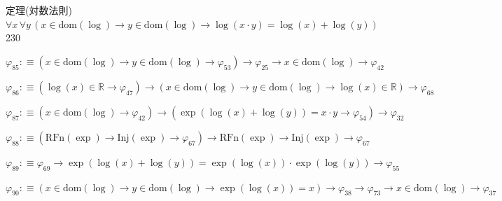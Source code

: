 \begin{fullproof}{定理(対数法則)}{$\forall x\,\forall y\,(x \in \mathrm{dom}(\log) \to y \in \mathrm{dom}(\log) \to \log(x \cdot y) = \log(x) + \log(y))$}{230}
\begin{abbrevlist}
\item $\varphi_{85} :\equiv (x \in \mathrm{dom}(\log) \to y \in \mathrm{dom}(\log) \to \varphi_{53}) \to \varphi_{25} \to x \in \mathrm{dom}(\log) \to \varphi_{42}$
\item $\varphi_{86} :\equiv (\log(x) \in \mathbb{R} \to \varphi_{47}) \to (x \in \mathrm{dom}(\log) \to y \in \mathrm{dom}(\log) \to \log(x) \in \mathbb{R}) \to \varphi_{68}$
\item $\varphi_{87} :\equiv (x \in \mathrm{dom}(\log) \to \varphi_{42}) \to (\exp(\log(x) + \log(y)) = x \cdot y \to \varphi_{54}) \to \varphi_{32}$
\item $\varphi_{88} :\equiv (\mathrm{RFn}(\exp) \to \mathrm{Inj}(\exp) \to \varphi_{67}) \to \mathrm{RFn}(\exp) \to \mathrm{Inj}(\exp) \to \varphi_{67}$
\item $\varphi_{89} :\equiv \varphi_{69} \to \exp(\log(x) + \log(y)) = \exp(\log(x)) \cdot \exp(\log(y)) \to \varphi_{55}$
\item $\varphi_{90} :\equiv (x \in \mathrm{dom}(\log) \to y \in \mathrm{dom}(\log) \to \exp(\log(x)) = x) \to \varphi_{38} \to \varphi_{73} \to x \in \mathrm{dom}(\log) \to \varphi_{37}$
\end{abbrevlist}
\end{fullproof}
